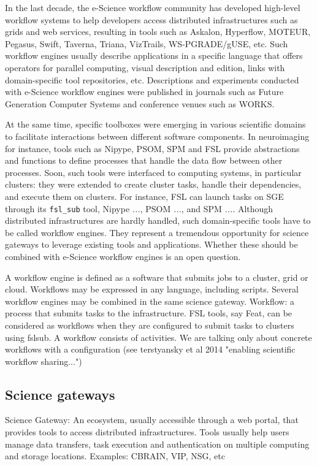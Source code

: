 \documentclass[preprint,3p,twocolumn]{elsarticle}
\newcommand{\todo}[1]{\color{blue}\xspace\emph{#1}\xspace\color{black}}
\begin{document}
In the last decade, the e-Science workflow community has developed
high-level workflow systems to help developers access distributed
infrastructures such as grids and web services, resulting in tools
such as Askalon, Hyperflow, MOTEUR, Pegasus, Swift, Taverna, Triana,
VizTrails, WS-PGRADE/gUSE, etc. Such workflow engines usually describe
applications in a specific language that offers operators for parallel
computing, visual description and edition, links with domain-specific
tool repositories, etc. Descriptions and experiments conducted with
e-Science workflow engines were published in journals such as Future
Generation Computer Systems and conference venues such as
WORKS. 

At the same time, specific toolboxes were emerging in various
scientific domains to facilitate interactions between different
software components. In neuroimaging for instance, tools such as
Nipype, PSOM, SPM and FSL provide abstractions and functions to define
processes that handle the data flow between other processes. Soon,
such tools were interfaced to computing systems, in particular
clusters: they were extended to create cluster tasks, handle their
dependencies, and execute them on clusters. For instance, FSL can
launch tasks on SGE through its \texttt{fsl\_sub} tool, Nipype
\todo{...}, PSOM \todo{...}, and SPM \todo{...}. Although distributed
infrastructures are hardly handled, such domain-specific tools have to
be called workflow engines. They represent a tremendous opportunity
for science gateways to leverage existing tools and
applications. Whether these should be combined with e-Science workflow
engines is an open question.

A workflow engine is defined as a software that submits jobs to a
cluster, grid or cloud. Workflows may be expressed in any language,
including scripts. Several workflow engines may be combined in the
same science gateway. Workflow: a process that submits tasks to the
infrastructure. FSL tools, say Feat, can be considered as workflows
when they are configured to submit tasks to clusters using fslsub. A
workflow consists of activities. We are talking only about concrete
workflows with a configuration (see terstyansky et al 2014 "enabling
scientific workflow sharing...")

\subsection{Science gateways}

Science Gateway: An ecosystem, usually accessible through a web
  portal, that provides tools to access distributed
  infrastructures. Tools usually help users manage data transfers,
  task execution and authentication on multiple computing and storage
  locations. Examples: CBRAIN, VIP, NSG, etc
\end{document}
